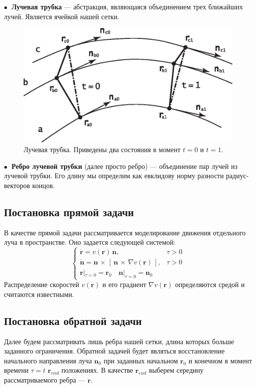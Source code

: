 \documentclass[12pt, cleqn, a4paper]{article}
\newcommand{\bfv}[1]{\mathbf{#1}}
\newcommand{\dd}[1]{\dot{#1}}
\newcommand{\dvp}[3]{#1\,\times\,[\,#2\,\times\,#3\,]}
\newcommand{\dv}[1]{\nabla v(#1)}
\newcommand{\hr}{\hat{\bfv{r}}}
\begin{document}
$\bullet\;$ \textbf{Лучевая трубка} --- абстракция, являющаяся объединением трех ближайших лучей. Является ячейкой нашей сетки.

\begin{figure}[h!]
    \centering
    \includegraphics[width=0.6\linewidth]{tube.eps}
    \caption{Лучевая трубка. Приведены два состояния в момент  $t = 0$ и $t = 1$.}
\end{figure}

$\bullet\;$ \textbf{Ребро лучевой трубки} (далее просто ребро) --- объединение пар лучей из лучевой трубки. Его длину мы определим как евклидову норму разности радиус-векторов концов.

\subsection{Постановка прямой задачи}
В качестве прямой задачи рассматривается моделирование движения отдельного луча в пространстве. Оно задается следующей системой:
\begin{equation} \label{eq:01}
\begin{cases}
\dd{\bfv{r}} = v(\bfv{r})\,\bfv{n}, &\tau > 0\\
\dd{\bfv{n}} = \dvp{\bfv{n}}{\bfv{n}}{\dv{\bfv{r}}}, &\tau > 0\\
\bfv{r}|_{\tau=0} = \bfv{r}_0 \quad \bfv{n}|_{\tau=0} = \bfv{n}_0
\end{cases}
\end{equation}
Распределение скоростей $v(\bfv{r})$ и его градиент $\dv{\bfv{r}}$ определяются средой и считаются известными.

\subsection{Постановка обратной задачи}
Далее будем рассматривать лишь ребра нашей сетки, длина которых больше заданного ограничения. Обратной задачей будет являться восстановление начального направления луча $\bfv{n}_0$ при заданных начальном $\bfv{r}_0$ и конечном в момент времени $\tau = t$ $\bfv{r}_{end}$ положениях. В качестве $\bfv{r}_{end}$ выберем середину рассматриваемого ребра --- $\hr$.
\end{document}
